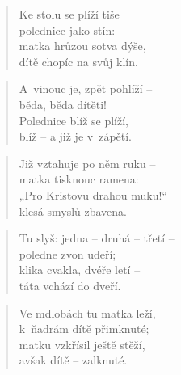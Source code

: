 \begin{verse}
Ke stolu se plíží tiše \\
polednice jako stín: \\
matka hrůzou sotva dýše, \\
dítě chopíc na svůj klín.
\end{verse}

\begin{verse}
A~vinouc je, zpět pohlíží -- \\
běda, běda dítěti! \\
Polednice blíž se plíží, \\
blíž -- a již je v~zápětí.
\end{verse}

\begin{verse}
Již vztahuje po něm ruku -- \\
matka tisknouc ramena: \\
„Pro Kristovu drahou muku!“ \\
klesá smyslů zbavena.
\end{verse}

\begin{verse}
Tu slyš: jedna -- druhá -- třetí -- \\
poledne zvon udeří; \\
klika cvakla, dvéře letí -- \\
táta vchází do dveří.
\end{verse}

\begin{verse}
Ve mdlobách tu matka leží, \\
k~ňadrám dítě přimknuté; \\
matku vzkřísil ještě stěží, \\
avšak dítě -- zalknuté.
\end{verse}